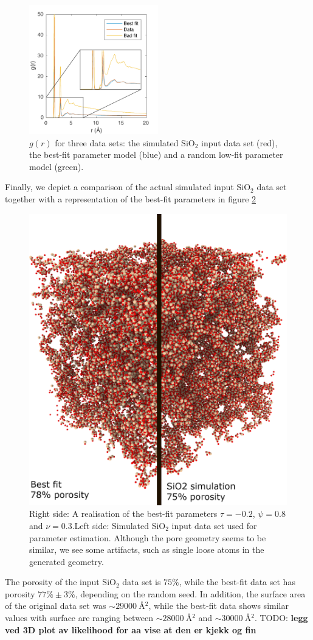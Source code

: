 \documentclass[aps,pre,twocolumn,letterpaper,floatfix,showpacs]{revtex4}
\newcommand{\todo}[1]{ {\color{Magenta} TODO: \color{Blue} \textbf{#1} }}
\begin{document}
\begin{figure}
\includegraphics[width=0.5\textwidth]{gofr_figure.pdf}
\caption{$g(r)$ for three data sets: the simulated SiO$_2$ input data set (red), the best-fit parameter model (blue) and a random low-fit parameter model (green).}
\label{fig:gofr1}
\end{figure}
Finally, we depict a comparison of the actual simulated input SiO$_2$ data set together with a
representation of the best-fit parameters in figure \ref{fig:porous_vs_model}   
\begin{figure}
\includegraphics[width=.45\textwidth]{comparison.png}
\caption{Right side: A realisation of the best-fit parameters $\tau=-0.2$, $\psi=0.8$ and $\nu=0.3$.Left side: Simulated SiO$_2$ input data set used for parameter estimation. Although the pore geometry seems to be similar, we see some artifacts, such as single loose atoms in the generated geometry.}
\label{fig:porous_vs_model}
\end{figure}

The porosity of the input SiO$_2$ data set is $75\%$, while the best-fit data set has
porosity $77\% \pm 3 \%$, depending on the random seed. In addition, the surface area
of the original data set was $\sim \SI{29000}{\angstrom^2}$, while the best-fit data
shows similar values with surface are ranging between $\sim \SI{28000}{\angstrom^2}$ and $\sim \SI{30000}{\angstrom^2}$.
\todo{legg ved 3D plot av likelihood for aa vise at den er kjekk og fin}
\end{document}
